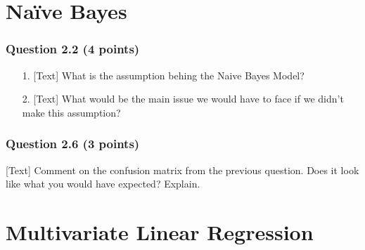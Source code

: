 \documentclass[12pt]{article}
\begin{document}
\clearpage
{}
% 


\section*{Na\"ive Bayes}
\subsubsection*{Question 2.2 (4 points)}
\begin{enumerate}
    \item [1.] [Text] What is the assumption behing the Naive Bayes Model?
    \item [2.] [Text] What would be the main issue we would have to face if we didn't make this assumption?
\end{enumerate}




\subsubsection*{Question 2.6 (3 points)}
[Text] Comment on the confusion matrix from the previous question. Does it look like what you would have expected? Explain.









% 


\section*{Multivariate Linear Regression}
\end{document}
